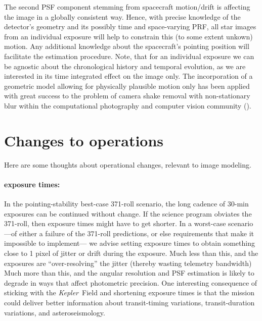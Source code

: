 \documentclass[letterpaper,12pt,whitepaper]{haastex}
\newcommand{\observatory}[1]{\textsl{#1}}
\newcommand{\Kepler}{\observatory{Kepler}}
\begin{document}
The second PSF component stemming from spacecraft motion/drift is
affecting the image in a globally consistent way. Hence, with precise
knowledge of the detector's geometry and its possibly time and
space-varying PRF, all star images from an individual exposure will
help to constrain this (to some extent unkown) motion. Any additional
knowledge about the spacecraft's pointing position will facilitate the
estimation procedure. Note, that for an individual exposure we can be
agnostic about the chronological history and temporal evolution, as we
are interested in its time integrated effect on the image only. The
incorporation of a geometric model allowing for physically plausible
motion only has been applied with great success to the problem of
camera shake removal with non-stationary blur within the computational
photography and computer vision community
(\cite{fergus2006,whyte2010,hirsch2011,koehler2012}).




\section{Changes to operations}\label{sec:operations}

Here are some thoughts about operational changes, relevant to image
modeling.

\paragraph{exposure times:}
In the pointing-stability best-case 371-roll scenario,
  the long cadence of 30-min exposures can be continued without change.
If the science program obviates the 371-roll,
  then exposure times might have to get shorter.
In a worst-case scenario%
  ---of either a failure of the 371-roll predictions,
  or else requirements that make it impossible to implement---%
  we advise setting exposure times to obtain something close to 1 pixel
  of jitter or drift during the exposure.
Much less than this, and the exposures are ``over-resolving'' the jitter
  (thereby wasting telemetry bandwidth)
Much more than this, and the angular resolution and PSF estimation is
  likely to degrade in ways that affect photometric precision.
One interesting consequence of sticking with the \Kepler~Field and shortening
  exposure times is that the mission could deliver better information
  about transit-timing variations, transit-duration variations, and asteroseismology.
\end{document}
